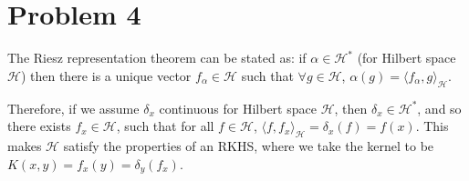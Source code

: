 \documentclass[12pt]{article}
\begin{document}
\section*{Problem 4}
\label{sec:prob4}
The Riesz representation theorem can be stated as: if $\alpha \in \mathcal{H}^{*}$
(for Hilbert space $\mathcal{H}$) then there is a unique vector 
$f_{\alpha} \in \mathcal{H}$ such that $\forall g \in \mathcal{H}$, $\alpha(g) = \langle f_{\alpha}, g \rangle_{\mathcal{H}}$.

Therefore, if we assume $\delta_x$ continuous for Hilbert space $\mathcal{H}$,
then $\delta_x \in \mathcal{H}^{*}$, and so 
there exists $f_x \in \mathcal{H}$, such that for all $f \in \mathcal{H}$,
$\langle f, f_x \rangle_{\mathcal{H}} = \delta_x(f) = f(x)$. This makes 
$\mathcal{H}$ satisfy the properties of an RKHS, where we take the kernel 
to be  $K(x,y) = f_x(y) = \delta_y(f_x)$.
\end{document}
